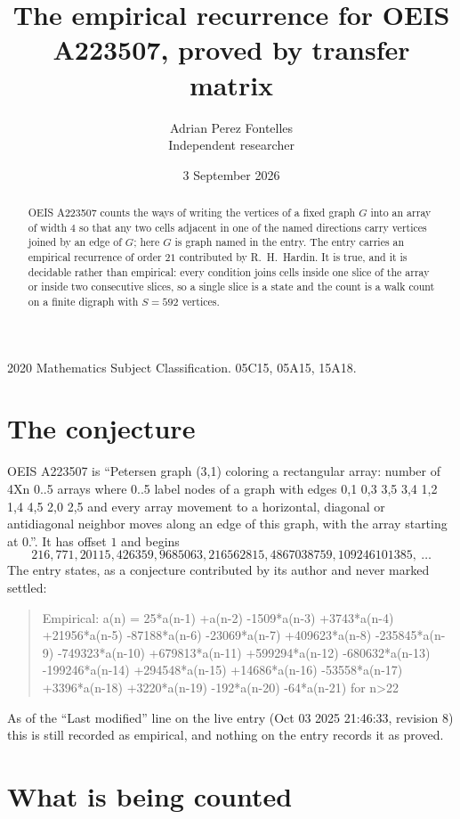 \documentclass[11pt,a4paper]{article}
\title{The empirical recurrence for OEIS A223507, proved by transfer matrix}
\author{Adrian Perez Fontelles\\ \small Independent researcher}
\date{3 September 2026}
\theoremstyle{plain}
\theoremstyle{definition}
\begin{document}
\maketitle

\begin{abstract}
OEIS A223507 counts the ways of writing the vertices of a fixed graph $G$ into an array of width
$4$ so that any two cells adjacent in one of the named directions carry vertices joined by an
edge of $G$; here $G$ is graph named in the entry. The entry carries an empirical recurrence of order $21$
contributed by R.~H.~Hardin. It is true, and it is decidable rather than empirical: every
condition joins cells inside one slice of the array or inside two consecutive slices, so a
single slice is a state and the count is a walk count on a finite digraph with $S=592$ vertices.
\end{abstract}

\noindent\small 2020 Mathematics Subject Classification. 05C15, 05A15, 15A18.\normalsize

\section{The conjecture}

OEIS A223507 is ``Petersen graph (3,1) coloring a rectangular array: number of 4Xn 0..5 arrays where 0..5 label nodes of a graph with edges 0,1 0,3 3,5 3,4 1,2 1,4 4,5 2,0 2,5 and every array movement to a horizontal, diagonal or antidiagonal neighbor moves along an edge of this graph, with the array starting at 0.''. It has offset $1$ and begins
\[
216, 771, 20115, 426359, 9685063, 216562815, 4867038759, 109246101385,\ \dots
\]
The entry states, as a conjecture contributed by its author and never marked settled:
\begin{quote}
Empirical: a(n) = 25*a(n-1) +a(n-2) -1509*a(n-3) +3743*a(n-4) +21956*a(n-5) -87188*a(n-6) -23069*a(n-7) +409623*a(n-8) -235845*a(n-9) -749323*a(n-10) +679813*a(n-11) +599294*a(n-12) -680632*a(n-13) -199246*a(n-14) +294548*a(n-15) +14686*a(n-16) -53558*a(n-17) +3396*a(n-18) +3220*a(n-19) -192*a(n-20) -64*a(n-21) for n>22
\end{quote}
As of the ``Last modified'' line on the live entry (Oct 03 2025 21:46:33, revision 8) this is still
recorded as empirical, and nothing on the entry records it as proved.

\section{What is being counted}
\end{document}
